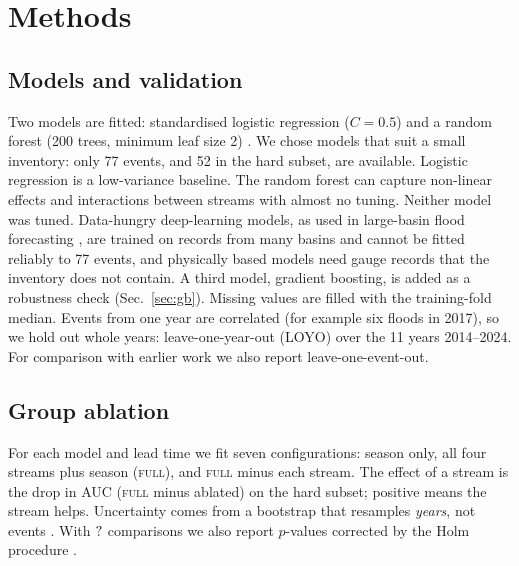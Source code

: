 \section{Methods}
\subsection{Models and validation}
Two models are fitted: standardised logistic regression ($C=0.5$) and a random forest (200 trees, minimum leaf size 2) \cite{pedregosa2011}. We chose models that suit a small inventory: only 77 events, and 52 in the hard subset, are available. Logistic regression is a low-variance baseline. The random forest can capture non-linear effects and interactions between streams with almost no tuning. Neither model was tuned. Data-hungry deep-learning models, as used in large-basin flood forecasting \cite{nevo2022,nearing2024}, are trained on records from many basins and cannot be fitted reliably to 77 events, and physically based models need gauge records that the inventory does not contain. A third model, gradient boosting, is added as a robustness check (Sec.~\ref{sec:gb}). Missing values are filled with the training-fold median. Events from one year are correlated (for example six floods in 2017), so we hold out whole years: leave-one-year-out (LOYO) over the 11 years 2014--2024. For comparison with earlier work we also report leave-one-event-out.

\subsection{Group ablation}
For each model and lead time we fit seven configurations: season only, all four streams plus season (\textsc{full}), and \textsc{full} minus each stream. The effect of a stream is the drop in AUC (\textsc{full} minus ablated) on the hard subset; positive means the stream helps. Uncertainty comes from a bootstrap that resamples \emph{years}, not events \cite{field2007,efron1993}. With $?$ comparisons we also report $p$-values corrected by the Holm procedure \cite{holm1979}.

